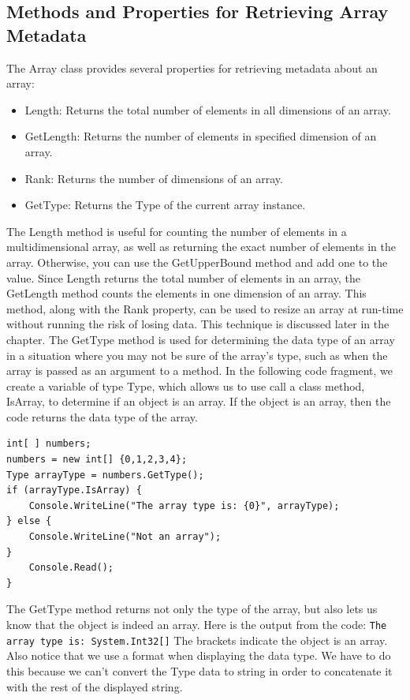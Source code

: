 \documentclass[12pt,a4paper,final,twoside,titlepage]{book}
\begin{document}
\subsection{Methods and Properties for Retrieving Array Metadata}
The Array class provides several properties for retrieving metadata about an array:
\begin{itemize}
\item Length: Returns the total number of elements in all dimensions of an array. 
\item GetLength: Returns the number of elements in specified dimension of an array.
\item Rank: Returns the number of dimensions of an array.
\item GetType: Returns the Type of the current array instance.
\end{itemize}
The Length method is useful for counting the number of elements in a multidimensional array, as well as returning the exact number of elements in the array. Otherwise, you can use the GetUpperBound method and add one to the value.
Since Length returns the total number of elements in an array, the GetLength method counts the elements in one dimension of an array. This method, along with the Rank property, can be used to resize an array at run-time without running the risk of losing data. This technique is discussed later in the chapter.
The GetType method is used for determining the data type of an array in a situation where you may not be sure of the array’s type, such as when the array is passed as an argument to a method. In the following code fragment, we create a variable of type Type, which allows us to use call a class method, IsArray, to determine if an object is an array. If the object is an array, then the code returns the data type of the array.
\begin{lstlisting}
int[ ] numbers;
numbers = new int[] {0,1,2,3,4}; 
Type arrayType = numbers.GetType(); 
if (arrayType.IsArray) {
	Console.WriteLine("The array type is: {0}", arrayType); 
} else {
    Console.WriteLine("Not an array");
}
  	Console.Read();
}
\end{lstlisting}
The GetType method returns not only the type of the array, but also lets us know that the object is indeed an array. Here is the output from the code:
\texttt{The array type is: System.Int32[]}
The brackets indicate the object is an array. Also notice that we use a format when displaying the data type. We have to do this because we can’t convert the Type data to string in order to concatenate it with the rest of the displayed string.
\end{document}

